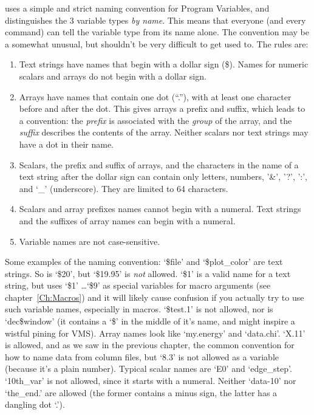 {\ifeffit} uses a simple and strict naming convention for Program
Variables, and distinguishes the 3 variable types {\emph{by name}}.
This means that everyone (and every command) can tell the variable
type from its name alone.  The convention may be a somewhat unusual,
but shouldn't be very difficult to get used to.  The rules are:

\begin{enumerate}
\item {{Text strings}} have names that begin with a dollar sign ({\$}).
  Names for numeric scalars and arrays do not begin with a dollar sign.
\item {{Arrays}} have names that contain one dot (``.''), with at least
  one character before and after the dot.  This gives arrays a prefix and
  suffix, which leads to a convention: the {\emph{prefix}} is associated
  with the {\emph{group}} of the array, and the {\emph{suffix}} describes
  the contents of the array.  Neither scalars nor text strings
  may have a dot in their name.
\item Scalars, the prefix and suffix of arrays, and the characters in the
  name of a text string after the dollar sign can contain only letters,
  numbers, '\&', '?', ':', and `\_' (underscore).  They are limited to 64
  characters.
\item Scalars and array prefixes names cannot begin with a numeral.   
  Text strings and the  suffixes of array names can begin with a numeral.    
\item Variable names are not case-sensitive.
\end{enumerate}
\noindent
Some examples of the naming convention: `\$file' and `\$plot\_color' are
text strings.  So is `\$20', but `\$19.95' is {\emph{not}} allowed. `\$1'
is a valid name for a text string, but {\ifeffit} uses `\$1' \ldots `\$9'
as special variables for macro arguments (see chapter~\ref{Ch:Macros}) and
it will likely cause confusion if you actually try to use such variable
names, especially in macros.  `\$test.1' is not allowed, nor is
`dec\$window' (it contains a `\$' in the middle of it's name, and might
inspire a wistful pining for VMS).  Array names look like `my.energy' and
`data.chi'.  `X.11' is allowed, and as we saw in the previous chapter, the
common convention for how to name data from column files, but `8.3' is not
allowed as a variable (because it's a plain number).  Typical scalar names
are `E0' and `edge\_step'.  `10th\_var' is not allowed, since it starts
with a numeral.  Neither `data-10' nor `the\_end.' are allowed (the former
contains a minus sign, the latter has a dangling dot `.').

